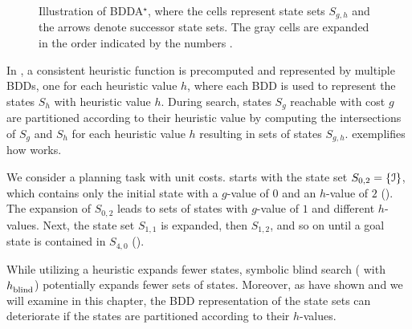 \begin{figure}
    \centering
    \caption[Illustration of BDDA$^\star$.]{Illustration of BDDA$^\star$, where the cells represent state sets $S_{g,h}$ and the arrows denote successor state sets. The gray cells are expanded in the order indicated by the numbers \autocite{torralba-gnad-icaps2017tutorial,torralba-phd2015}.
    }
    \label{fid:bddastar_example}
\end{figure}

In \bddastar{}, a consistent heuristic function is precomputed and represented by multiple BDDs, one for each heuristic value $h$, where each BDD is used to represent the states $S_h$ with heuristic value $h$.
During search, states $S_g$ reachable with cost $g$ are partitioned according to their heuristic value by computing the intersections of $S_g$ and $S_h$ for each heuristic value $h$ resulting in sets of states $S_{g,h}$.
%
 exemplifies how \bddastar{} works.

\begin{example}\label{ex:bddastar}
    We consider a planning task with unit costs. \bddastar{} starts with the state set $S_{0,2} = \{ \mathcal I \}$, which contains only the initial state with a $g$-value of 0 and an $h$-value of $2$ ().
    The expansion of $S_{0,2}$ leads to sets of states with $g$-value of $1$ and different $h$-values.
    Next, the state set $S_{1,1}$ is expanded, then $S_{1,2}$, and so on until a goal state is contained in $S_{4,0}$ ().
\end{example}

While \bddastar{} utilizing a heuristic expands fewer states, symbolic blind search (\bddastar{} with $h_\text{\scriptsize{blind}}^\text{\scriptsize{}}$) potentially expands fewer sets of states.
Moreover, as \textcite{speck-et-al-icaps2020} have shown and we will examine in this chapter, the BDD representation of the state sets can deteriorate if the states are partitioned according to their $h$-values.

